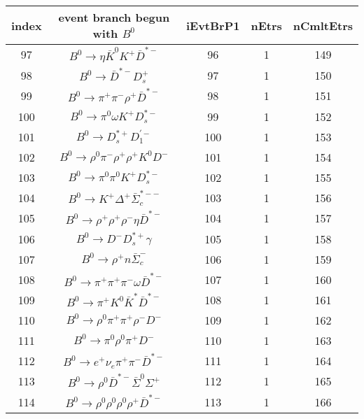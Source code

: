 \documentclass[landscape]{article}
\begin{document}
\begin{table}[htbp!]
\small
\centering
\begin{tabular}{|c|c|c|c|c|}
\hline
index & event branch begun with $ B^{0} $ & iEvtBrP1 & nEtrs & nCmltEtrs \\
\hline
97 & $ B^{0} \rightarrow \eta \bar{K}^{0} K^{+} \bar{D}^{*-} $ & 96 & 1 & 149 \\
\hline
98 & $ B^{0} \rightarrow \bar{D}^{*-} D_{s}^{+} $ & 97 & 1 & 150 \\
\hline
99 & $ B^{0} \rightarrow \pi^{+} \pi^{-} \rho^{+} \bar{D}^{*-} $ & 98 & 1 & 151 \\
\hline
100 & $ B^{0} \rightarrow \pi^{0} \omega K^{+} D_{s}^{*-} $ & 99 & 1 & 152 \\
\hline
101 & $ B^{0} \rightarrow D_{s}^{*+} D_{1}^{\prime-} $ & 100 & 1 & 153 \\
\hline
102 & $ B^{0} \rightarrow \rho^{0} \pi^{-} \rho^{+} \rho^{+} K^{0} D^{-} $ & 101 & 1 & 154 \\
\hline
103 & $ B^{0} \rightarrow \pi^{0} \pi^{0} K^{+} D_{s}^{*-} $ & 102 & 1 & 155 \\
\hline
104 & $ B^{0} \rightarrow K^{+} \Delta^{+} \bar{\Sigma}_{c}^{*--} $ & 103 & 1 & 156 \\
\hline
105 & $ B^{0} \rightarrow \rho^{+} \rho^{+} \rho^{-} \eta \bar{D}^{*-} $ & 104 & 1 & 157 \\
\hline
106 & $ B^{0} \rightarrow D^{-} D_{s}^{*+} \gamma $ & 105 & 1 & 158 \\
\hline
107 & $ B^{0} \rightarrow \rho^{+} n \bar{\Sigma}_{c}^{-} $ & 106 & 1 & 159 \\
\hline
108 & $ B^{0} \rightarrow \pi^{+} \pi^{+} \pi^{-} \omega \bar{D}^{*-} $ & 107 & 1 & 160 \\
\hline
109 & $ B^{0} \rightarrow \pi^{+} K^{0} \bar{K}^{*} \bar{D}^{*-} $ & 108 & 1 & 161 \\
\hline
110 & $ B^{0} \rightarrow \rho^{0} \pi^{+} \pi^{+} \rho^{-} D^{-} $ & 109 & 1 & 162 \\
\hline
111 & $ B^{0} \rightarrow \pi^{0} \rho^{0} \pi^{+} D^{-} $ & 110 & 1 & 163 \\
\hline
112 & $ B^{0} \rightarrow e^{+} \nu_{e} \pi^{+} \pi^{-} \bar{D}^{*-} $ & 111 & 1 & 164 \\
\hline
113 & $ B^{0} \rightarrow \rho^{0} \bar{D}^{*-} \bar{\Sigma}^{0} \Sigma^{+} $ & 112 & 1 & 165 \\
\hline
114 & $ B^{0} \rightarrow \rho^{0} \rho^{0} \rho^{0} \rho^{+} \bar{D}^{*-} $ & 113 & 1 & 166 \\

\end{tabular}
\end{table}
\end{document}
